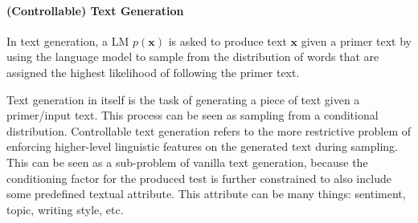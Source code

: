 
\paragraph{(Controllable) Text Generation}


In text generation, a LM $p(\textbf{x})$ is asked to produce text $\textbf{x}$ given a primer text by using the language model to sample from the distribution of words that are assigned the highest likelihood of following the primer text.

Text generation in itself is the task of generating a piece of text given a primer/input text. This process can be seen as sampling from a conditional distribution. Controllable text generation refers to the more restrictive problem of enforcing higher-level linguistic features on the generated text during sampling. This can be seen as a sub-problem of vanilla text generation, because the conditioning factor for the produced test is further constrained to also include some predefined textual attribute. This attribute can be many things: sentiment, topic, writing style, etc. 

